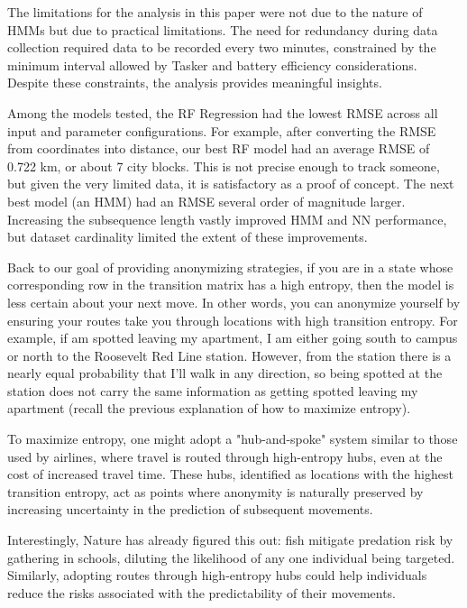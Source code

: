 \documentclass[11pt]{amsart}
\begin{document}

The limitations for the analysis in this paper were not due to the nature of HMMs but due to practical limitations.
The need for redundancy during data collection required data to be recorded every two minutes, constrained by the minimum interval allowed by Tasker and battery efficiency considerations.
Despite these constraints, the analysis provides meaningful insights.

Among the models tested, the RF Regression had the lowest RMSE across all input and parameter configurations.
For example, after converting the RMSE from coordinates into distance, our best RF model had an average RMSE of 0.722 km, or about 7 city blocks.
This is not precise enough to track someone, but given the very limited data, it is satisfactory as a proof of concept.
The next best model (an HMM) had an RMSE several order of magnitude larger.
Increasing the subsequence length vastly improved HMM and NN performance, but dataset cardinality limited the extent of these improvements.

Back to our goal of providing anonymizing strategies, if you are in a state whose corresponding row in the transition matrix has a high entropy, then the model is less certain about your next move.
In other words, you can anonymize yourself by ensuring your routes take you through locations with high transition entropy.
For example, if am spotted leaving my apartment, I am either going south to campus or north to the Roosevelt Red Line station.
However, from the station there is a nearly equal probability that I'll walk in any direction, so being spotted at the station does not carry the same information as getting spotted leaving my apartment (recall the previous explanation of how to maximize entropy).

To maximize entropy, one might adopt a "hub-and-spoke" system similar to those used by airlines, where travel is routed through high-entropy hubs, even at the cost of increased travel time.
These hubs, identified as locations with the highest transition entropy, act as points where anonymity is naturally preserved by increasing uncertainty in the prediction of subsequent movements.

Interestingly, Nature has already figured this out: fish mitigate predation risk by gathering in schools, diluting the likelihood of any one individual being targeted.
Similarly, adopting routes through high-entropy hubs could help individuals reduce the risks associated with the predictability of their movements.
\end{document}
